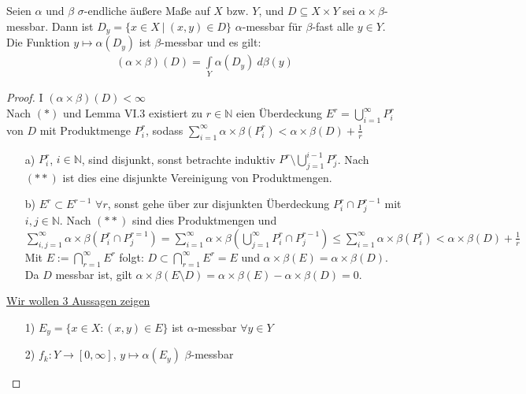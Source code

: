   \begin{theorem}
    Seien $\alpha$ und $\beta$ $\sigma$-endliche äußere Maße auf $X$ bzw. $Y$, und $D \subseteq X \times Y$ sei $\alpha \times \beta$-messbar. Dann ist $D_y = \{x \in X \ | \ (x,y) \in D\}$ $\alpha$-messbar für $\beta$-fast alle $y \in Y$. Die Funktion $y \mapsto \alpha(D_y)$ ist $\beta$-messbar und es gilt:
    \begin{align*}
      (\alpha \times \beta)(D) = \int\limits_Y \alpha(D_y) \ d\beta(y)
    \end{align*}
  \end{theorem}
  \begin{proof}
    \item[I] \underline{$(\alpha\times\beta)(D) < \infty$} \\
    Nach $(\ast)$ und Lemma VI.3 existiert zu $r\in\mathbb{N}$ eien Überdeckung $E^r = \bigcup\limits_{i=1}^\infty P_i^r$ von $D$ mit Produktmenge $P_i^r$, sodass 
   	$\sum\limits_{i=1}^\infty \alpha\times \beta (P_i^r) < \alpha\times\beta(D) + \frac{1}{r}$
   	\begin{itemize} 
   	\item[a)] $P_i^r$, $i\in\mathbb{N}$, sind disjunkt, sonst betrachte induktiv $P^r\setminus \bigcup\limits_{j=1}^{i-1}P_j^r$. Nach $(\ast\ast)$ ist dies eine disjunkte Vereinigung von Produktmengen.
   	\item[b)] $E^r\subset E^{r-1}$ $\forall r$, sonst gehe über zur disjunkten Überdeckung $P^r_i \cap P_j^{r-1}$ mit $i,j\in\mathbb{N}$. Nach $(\ast\ast)$ sind dies Produktmengen und \\
   	$\sum\limits_{i,j=1}^\infty \alpha\times\beta (P_i^r\cap P_j^{r=1}) = \sum\limits_{i=1}^\infty \alpha\times\beta(\bigcup\limits_{j=1}^\infty P_i^r\cap P_j^{r-1}) \leq \sum\limits_{i=1}^\infty\alpha\times\beta (P_i^r)<\alpha\times\beta (D) + \frac{1}{r}$ Mit $E:=\bigcap\limits_{r=1}^\infty E^r$ folgt: $D\subset \bigcap\limits_{r=1}^\infty E^r = E$ und $\alpha\times\beta(E) = \alpha\times\beta(D)$. Da $D$ messbar ist, gilt $\alpha\times\beta(E\setminus D) = \alpha\times\beta (E) - \alpha\times\beta(D) = 0$. 
   	\end{itemize} 
   	\item[]\underline{Wir wollen 3 Aussagen zeigen}
   	\begin{itemize}
   		\item[1)] $E_y = \{x\in X: (x,y)\in E \}$ ist $\alpha$-messbar $\forall y\in Y$
   		\item[2)] $f_k: Y \to [0,\infty]$, $y \mapsto \alpha(E_y)$ $\beta$-messbar

\end{itemize}
\end{proof}
